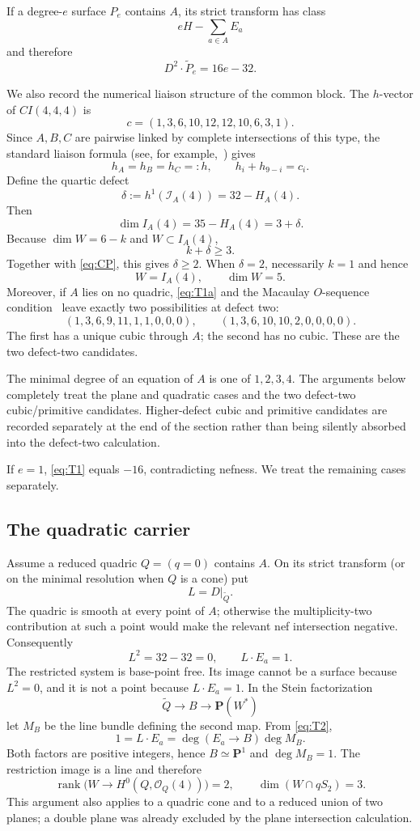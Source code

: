 \documentclass[11pt,reqno]{amsart}
\theoremstyle{remark}
\newcommand{\PP}{\mathbf P}
\newcommand{\cO}{\mathcal O}
\newcommand{\cI}{\mathcal I}
\begin{document}
If a degree-$e$ surface $P_e$ contains $A$, its strict transform has class
\[
eH-\sum_{a\in A}E_a
\]
and therefore
\[
D^2\cdot\widetilde P_e=16e-32. \tag{T1}\label{eq:T1}
\]

We also record the numerical liaison structure of the common block.  The $h$-vector of $CI(4,4,4)$ is
\[
c=(1,3,6,10,12,12,10,6,3,1).
\]
Since $A,B,C$ are pairwise linked by complete intersections of this type, the standard liaison formula (see, for example,~\cite{Migliore}) gives
\[
\boxed{h_A=h_B=h_C=:h,\qquad h_i+h_{9-i}=c_i.} \tag{T1a}\label{eq:T1a}
\]
Define the quartic defect
\[
\delta:=h^1(\cI_A(4))=32-H_A(4).
\]
Then
\[
\dim I_A(4)=35-H_A(4)=3+\delta. \tag{T1b}\label{eq:T1b}
\]
Because $\dim W=6-k$ and $W\subset I_A(4)$,
\[
k+\delta\ge3. \tag{T1c}\label{eq:T1c}
\]
Together with \eqref{eq:CP}, this gives $\delta\ge2$.  When $\delta=2$, necessarily $k=1$ and hence
\[
W=I_A(4),\qquad \dim W=5. \tag{T1d}\label{eq:T1d}
\]
Moreover, if $A$ lies on no quadric, \eqref{eq:T1a} and the Macaulay $O$-sequence condition~\cite{StanleyHilbert} leave exactly two possibilities at defect two:
\[
(1,3,6,9,11,1,1,0,0,0),
\qquad
(1,3,6,10,10,2,0,0,0,0). \tag{T1e}\label{eq:T1e}
\]
The first has a unique cubic through $A$; the second has no cubic.  These are the two defect-two candidates.

The minimal degree of an equation of $A$ is one of $1,2,3,4$.  The arguments below completely treat the plane and quadratic cases and the two defect-two cubic/primitive candidates.  Higher-defect cubic and primitive candidates are recorded separately at the end of the section rather than being silently absorbed into the defect-two calculation.

If $e=1$, \eqref{eq:T1} equals $-16$, contradicting nefness.  We treat the remaining cases separately.

\subsection{The quadratic carrier}
Assume a reduced quadric $Q=(q=0)$ contains $A$.  On its strict transform (or on the minimal resolution when $Q$ is a cone) put
\[
L=D|_{\widetilde Q}.
\]
The quadric is smooth at every point of $A$; otherwise the multiplicity-two contribution at such a point would make the relevant nef intersection negative.  Consequently
\[
L^2=32-32=0,
\qquad
L\cdot E_a=1. \tag{T2}\label{eq:T2}
\]
The restricted system is base-point free.  Its image cannot be a surface because $L^2=0$, and it is not a point because $L\cdot E_a=1$.  In the Stein factorization
\[
\widetilde Q\longrightarrow B\longrightarrow\PP(W^*)
\]
let $M_B$ be the line bundle defining the second map.  From \eqref{eq:T2},
\[
1=L\cdot E_a=\deg(E_a\to B)\deg M_B.
\]
Both factors are positive integers, hence $B\simeq\PP^1$ and $\deg M_B=1$.  The restriction image is a line and therefore
\[
\operatorname{rank}\bigl(W\to H^0(Q,\cO_Q(4))\bigr)=2,
\qquad
\dim(W\cap qS_2)=3. \tag{T3}\label{eq:T3}
\]
This argument also applies to a quadric cone and to a reduced union of two planes; a double plane was already excluded by the plane intersection calculation.
\end{document}
